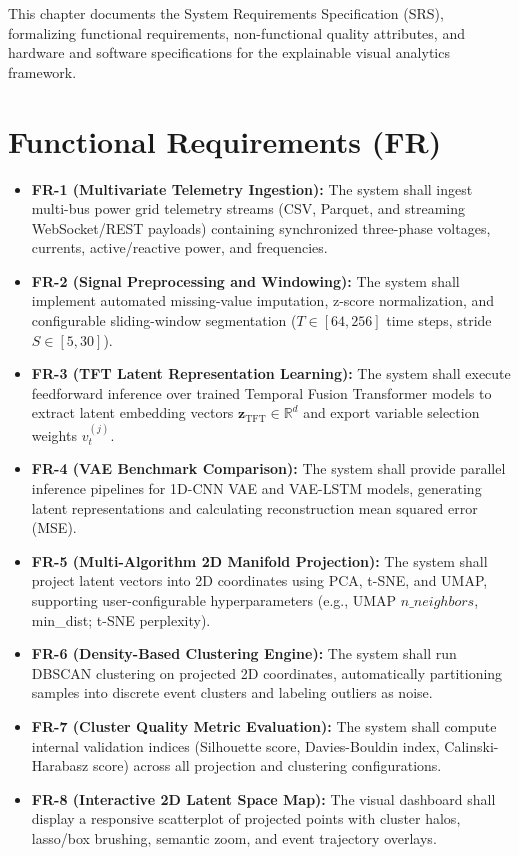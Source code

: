 \documentclass[12pt,a4paper]{report}
\begin{document}
This chapter documents the System Requirements Specification (SRS), formalizing functional requirements, non-functional quality attributes, and hardware and software specifications for the explainable visual analytics framework.

\section{Functional Requirements (FR)}
\begin{itemize}
    \item \textbf{FR-1 (Multivariate Telemetry Ingestion):} The system shall ingest multi-bus power grid telemetry streams (CSV, Parquet, and streaming WebSocket/REST payloads) containing synchronized three-phase voltages, currents, active/reactive power, and frequencies.
    \item \textbf{FR-2 (Signal Preprocessing and Windowing):} The system shall implement automated missing-value imputation, z-score normalization, and configurable sliding-window segmentation ($T \in [64, 256]$ time steps, stride $S \in [5, 30]$).
    \item \textbf{FR-3 (TFT Latent Representation Learning):} The system shall execute feedforward inference over trained Temporal Fusion Transformer models to extract latent embedding vectors $\mathbf{z}_{\text{TFT}} \in \mathbb{R}^d$ and export variable selection weights $v_t^{(j)}$.
    \item \textbf{FR-4 (VAE Benchmark Comparison):} The system shall provide parallel inference pipelines for 1D-CNN VAE and VAE-LSTM models, generating latent representations and calculating reconstruction mean squared error (MSE).
    \item \textbf{FR-5 (Multi-Algorithm 2D Manifold Projection):} The system shall project latent vectors into 2D coordinates using PCA, t-SNE, and UMAP, supporting user-configurable hyperparameters (e.g., UMAP $n\_neighbors$, min\_dist; t-SNE perplexity).
    \item \textbf{FR-6 (Density-Based Clustering Engine):} The system shall run DBSCAN clustering on projected 2D coordinates, automatically partitioning samples into discrete event clusters and labeling outliers as noise.
    \item \textbf{FR-7 (Cluster Quality Metric Evaluation):} The system shall compute internal validation indices (Silhouette score, Davies-Bouldin index, Calinski-Harabasz score) across all projection and clustering configurations.
    \item \textbf{FR-8 (Interactive 2D Latent Space Map):} The visual dashboard shall display a responsive scatterplot of projected points with cluster halos, lasso/box brushing, semantic zoom, and event trajectory overlays.

\end{itemize}
\end{document}
